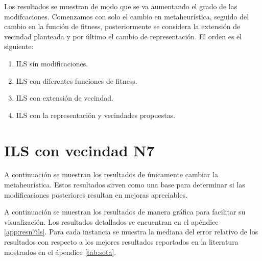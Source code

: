 Los resultados se muestran de modo que se va aumentando el grado de las modifcaciones. Comenzamos con solo el cambio en metaheurística, seguido del cambio en la función de fitness, posteriormente se considera la extensión de vecindad planteada y por último el cambio de representación. El orden es el siguiente:
\begin{enumerate}
    \item ILS sin modificaciones.
    \item ILS con diferentes funciones de fitness.
    \item ILS con extensión de vecindad.
    \item ILS con la representación y vecindades propuestas.
\end{enumerate}
\section{ILS con vecindad N7}
A continuación se muestran los resultados de únicamente cambiar la metaheurística. Estos resultados sirven como una base para determinar si las modificaciones posteriores resultan en mejoras apreciables.

A continuación se muestran los resultados de manera gráfica para facilitar su visualización. Los resultados detallados se encuentran en el apéndice \ref{app:resn7ils}. Para cada instancia se muestra la mediana del error relativo de los resultados con respecto a los mejores resultados reportados en la literatura mostrados en el ápendice \ref{tab:sota}. 

